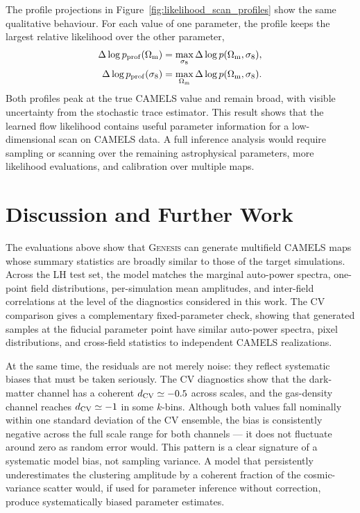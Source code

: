 \documentclass[usenatbib]{mnras}
\newcommand{\Om}{\Omega_{\rm m}}
\newcommand{\sig}{\sigma_8}
\begin{document}
The profile projections in
Figure~\ref{fig:likelihood_scan_profiles} show the same qualitative
behaviour. For each value of one parameter, the profile keeps the
largest relative likelihood over the other parameter,
\begin{equation}
\begin{aligned}
  \Delta\log p_{\rm prof}(\Om)
  =
  \max_{\sig}
  \Delta\log p(\Om,\sig),
  \\
  \Delta\log p_{\rm prof}(\sig)
  =
  \max_{\Om}
  \Delta\log p(\Om,\sig).
\end{aligned}
  \label{eq:profile_likelihood}
\end{equation}
Both profiles peak at the true CAMELS value and remain broad, with
visible uncertainty from the stochastic trace estimator. This result
shows that the learned flow likelihood contains useful parameter
information for a low-dimensional scan on CAMELS data. A full
inference analysis would require sampling or scanning over the
remaining astrophysical parameters, more likelihood evaluations, and
calibration over multiple maps.

\section{Discussion and Further Work}
\label{sec:discussion}

The evaluations above show that \textsc{Genesis} can generate
multifield CAMELS maps whose summary statistics are broadly similar
to those of the target simulations. Across the LH test set, the model
matches the marginal auto-power spectra, one-point field
distributions, per-simulation mean amplitudes, and inter-field
correlations at the level of the diagnostics considered in this work.
The CV comparison gives a complementary fixed-parameter check,
showing that generated samples at the fiducial parameter point have
similar auto-power spectra, pixel distributions, and cross-field
statistics to independent CAMELS realizations.

At the same time, the residuals are not merely noise: they reflect
systematic biases that must be taken seriously. The CV diagnostics
show that the dark-matter channel has a coherent $d_{\rm CV}\simeq
-0.5$ across scales, and the gas-density channel reaches $d_{\rm
CV}\simeq -1$ in some $k$-bins. Although both values fall nominally
within one standard deviation of the CV ensemble, the bias is
consistently negative across the full scale range for both channels
--- it does not fluctuate around zero as random error would. This
pattern is a clear signature of a systematic model bias, not sampling
variance. A model that persistently underestimates the clustering
amplitude by a coherent fraction of the cosmic-variance scatter
would, if used for parameter inference without correction, produce
systematically biased parameter estimates. 
\end{document}
